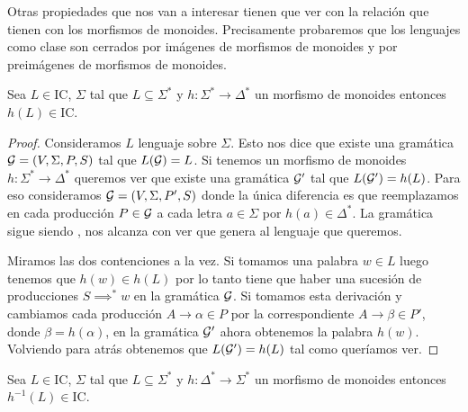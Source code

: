 \documentclass[tesis.tex]{subfiles}
\begin{document}
Otras propiedades que nos van a interesar tienen que ver con la relación que tienen con los morfismos de monoides.
Precisamente probaremos que los lenguajes \ic como clase son cerrados por imágenes de morfismos de monoides y por preimágenes de morfismos de monoides.
 

\begin{prop}\label{morfismos-monoides-ic}

		Sea $L \in \text{IC}$, $\Sigma$ tal que $L \subseteq \Sigma^{*}$ y $h:\Sigma^{*} \to \Delta^*$ un morfismo de monoides 
		 entonces $h(L) \in \text{IC}$.
		 
\end{prop}

\begin{proof}
		Consideramos $L$ lenguaje \ic sobre $\Sigma$.
		Esto nos dice que existe una gramática ${\cal G} = (V, \Sigma, P, S) $ tal que $L({\cal G}) = L$.
		Si tenemos un morfismo de monoides $h: \Sigma^* \to \Delta^*$ queremos ver que existe una gramática ${\cal G}'$ tal que $L({\cal G}') = h(L)$.
		Para eso consideramos ${\cal G}  = (V, \Sigma, P', S)$ donde la única diferencia es que reemplazamos en cada producción $P \in {\cal G}$ a cada letra $a \in \Sigma$ por $h(a) \in \Delta^*$.
		La gramática sigue siendo \ic, nos alcanza con ver que genera al lenguaje que queremos.
		
		Miramos las dos contenciones a la vez.		
		Si tomamos una palabra $w \in L$ luego tenemos que $h(w) \in h(L)$ por lo tanto tiene que haber una sucesión de producciones $S  \implies^* w  $ en la gramática ${\cal G}$.
		Si tomamos esta derivación y cambiamos cada producción $A \to \alpha \in P$ por la correspondiente $A \to \beta \in P'$, donde $\beta = h(\alpha)$, en la gramática ${\cal G}'$ ahora obtenemos la palabra $h(w)$.
		Volviendo para atrás obtenemos que $L({\cal G}') = h(L)$ tal como queríamos ver.

\end{proof}


\begin{prop}
	Sea $L \in \text{IC}$, $\Sigma$ tal que $L \subseteq \Sigma^{*}$ y $h:\Delta^{*} \to \Sigma^*$ un morfismo de monoides 
	entonces $h^{-1}(L) \in \text{IC}$.
\end{prop}
\end{document}
